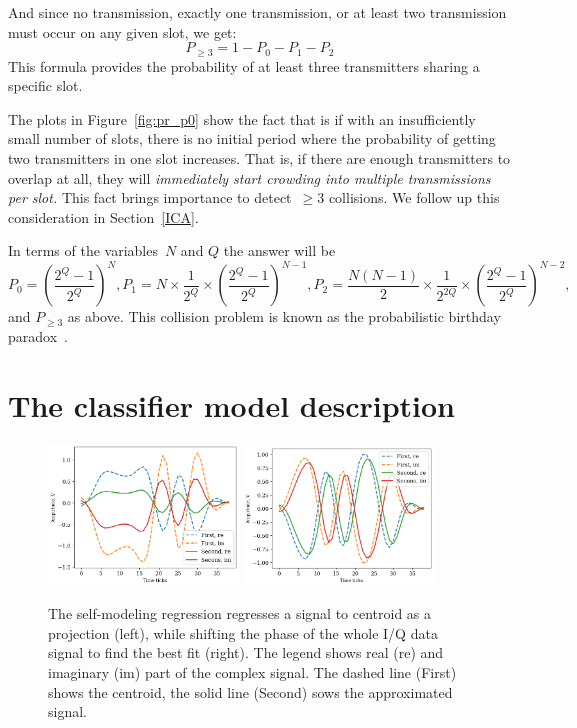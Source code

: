 \documentclass[12pt]{article}
\newcommand{\D}{{2^Q}}
\begin{document}
And since no transmission, exactly one transmission, or at least two transmission must occur on any given slot, we get:
\[
P_{\geq 3} = 1 - P_0 - P_1 - P_2 
\]
This formula provides the probability of at least three transmitters sharing a specific slot.

The plots in Figure~\ref{fig:pr_p0} show the fact that is if 
with an insufficiently small number of slots, there is no initial period where the probability of getting two transmitters in one slot increases. That is, if there are enough transmitters to overlap at all, they will \emph{immediately start crowding into multiple transmissions per slot.} This fact brings importance to detect~${\geq 3}$  collisions. We follow up this consideration in Section~\ref{ICA}.

In terms of the variables~$N$ and $Q$ the answer will be 
\[
P_0 = \left( \frac{\D-1}{\D} \right)^N, 
P_1 = N \times \frac{1}{\D} \times \left(\frac{\D-1}{\D}\right)^{N-1},
P_2 = \frac{N(N-1)}{2}  \times \frac{1}{2^{2Q}} \times \left(\frac{\D-1}{\D}\right)^{N-2},
\]
and $P_{\geq 3}$  as above. This collision problem is known as the probabilistic birthday paradox~\cite{Sun2021,Santos2015,Mosteller1962,Shakiba2014}.


\section{The classifier model description}

\begin{figure}[!bp]
\centering
\includegraphics[width=0.45\textwidth]{fig_amplitude_scaled_distance}
\includegraphics[width=0.45\textwidth]{fig_centroid_still_in_cluster}
\caption{The self-modeling regression regresses a signal to centroid as a projection (left), while shifting the phase of the whole I/Q data signal to find the best fit (right). The legend shows real (re) and imaginary (im) part of the complex signal. The dashed line (First) shows the centroid, the solid line (Second) sows the approximated signal.}
\label{fig:projected_shift}
\end{figure}
\end{document}
